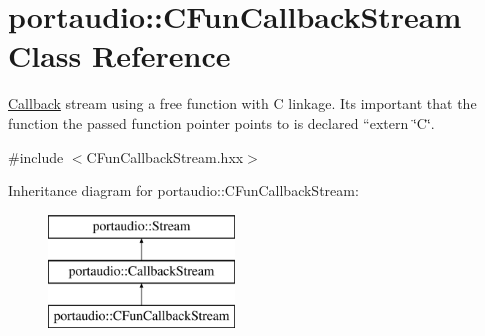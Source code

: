 \hypertarget{classportaudio_1_1_c_fun_callback_stream}{}\section{portaudio\+:\+:C\+Fun\+Callback\+Stream Class Reference}
\label{classportaudio_1_1_c_fun_callback_stream}


\hyperlink{class_callback}{Callback} stream using a free function with C linkage. It\textquotesingle{}s important that the function the passed function pointer points to is declared ``extern \char`\"{}\+C\char`\"{}\textquotesingle{}\textquotesingle{}.  




{\ttfamily \#include $<$C\+Fun\+Callback\+Stream.\+hxx$>$}

Inheritance diagram for portaudio\+:\+:C\+Fun\+Callback\+Stream\+:\begin{figure}[H]
\begin{center}
\leavevmode
\includegraphics[height=3.000000cm]{classportaudio_1_1_c_fun_callback_stream}
\end{center}
\end{figure}
